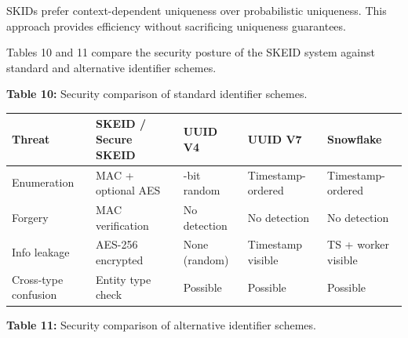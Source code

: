 \documentclass[fleqn,10pt,lineno]{wlpeerj}
\newcounter{none} %
\begin{document}
SKIDs prefer context-dependent uniqueness over probabilistic uniqueness.
This approach provides efficiency without sacrificing uniqueness
guarantees.

Tables 10 and 11 compare the security posture of the SKEID system
against standard and alternative identifier schemes.

\textbf{Table 10:} Security comparison of standard identifier schemes.

{\def\LTcaptype{none} %
\begin{longtable}[]{@{}
  >{\raggedright\arraybackslash}p{}
  >{\raggedright\arraybackslash}p{}
  >{\raggedright\arraybackslash}p{}
  >{\raggedright\arraybackslash}p{}
  >{\raggedright\arraybackslash}p{}@{}}
\toprule\noalign{}
\begin{minipage}[b]{\linewidth}\raggedright
Threat
\end{minipage} & \begin{minipage}[b]{\linewidth}\raggedright
SKEID / Secure SKEID
\end{minipage} & \begin{minipage}[b]{\linewidth}\raggedright
UUID V4
\end{minipage} & \begin{minipage}[b]{\linewidth}\raggedright
UUID V7
\end{minipage} & \begin{minipage}[b]{\linewidth}\raggedright
Snowflake
\end{minipage} \\
\midrule\noalign{}
\endhead
\bottomrule\noalign{}
\endlastfoot
Enumeration & MAC + optional AES & 122-bit random & Timestamp-ordered &
Timestamp-ordered \\
Forgery & MAC verification & No detection & No detection & No
detection \\
Info leakage & AES-256 encrypted & None (random) & Timestamp visible &
TS + worker visible \\
Cross-type confusion & Entity type check & Possible & Possible &
Possible \\
\end{longtable}
}

\textbf{Table 11:} Security comparison of alternative identifier
schemes.
\end{document}
